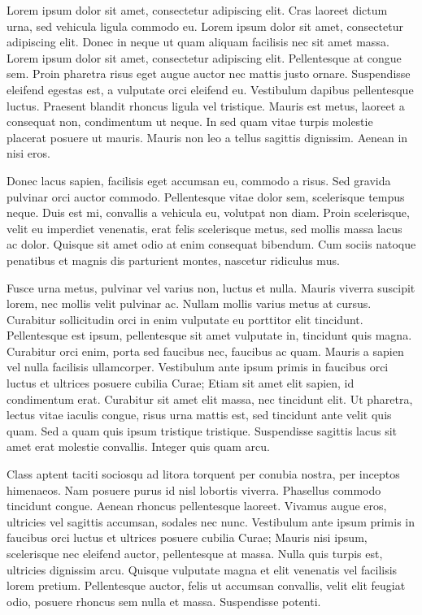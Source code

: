 \documentclass[12pt]{hw}
\begin{document}
Lorem ipsum dolor sit amet, consectetur adipiscing elit. Cras laoreet 
dictum urna, sed vehicula ligula commodo eu. Lorem ipsum dolor sit 
amet, consectetur adipiscing elit. Donec in neque ut quam aliquam 
facilisis nec sit amet massa. Lorem ipsum dolor sit amet, consectetur 
adipiscing elit. Pellentesque at congue sem. Proin pharetra risus 
eget augue auctor nec mattis justo ornare. Suspendisse eleifend 
egestas est, a vulputate orci eleifend eu. Vestibulum dapibus 
pellentesque luctus. Praesent blandit rhoncus ligula vel tristique. 
Mauris est metus, laoreet a consequat non, condimentum ut neque. In 
sed quam vitae turpis molestie placerat posuere ut mauris. Mauris non leo a
tellus sagittis dignissim. Aenean in nisi eros.

Donec lacus sapien, facilisis eget accumsan eu, commodo a risus. Sed
gravida pulvinar orci auctor commodo. Pellentesque vitae dolor sem,
scelerisque tempus neque. Duis est mi, convallis a vehicula eu, volutpat
non diam. Proin scelerisque, velit eu imperdiet venenatis, erat felis
scelerisque metus, sed mollis massa lacus ac dolor. Quisque sit amet odio
at enim consequat bibendum. Cum sociis natoque penatibus et magnis dis
parturient montes, nascetur ridiculus mus.

Fusce urna metus, pulvinar vel varius non, luctus et nulla. Mauris viverra
suscipit lorem, nec mollis velit pulvinar ac. Nullam mollis varius metus at
cursus. Curabitur sollicitudin orci in enim vulputate eu porttitor elit
tincidunt. Pellentesque est ipsum, pellentesque sit amet vulputate in,
tincidunt quis magna. Curabitur orci enim, porta sed faucibus nec, faucibus
ac quam. Mauris a sapien vel nulla facilisis ullamcorper. Vestibulum ante
ipsum primis in faucibus orci luctus et ultrices posuere cubilia Curae;
Etiam sit amet elit sapien, id condimentum erat. Curabitur sit amet elit
massa, nec tincidunt elit. Ut pharetra, lectus vitae iaculis congue, risus
urna mattis est, sed tincidunt ante velit quis quam. Sed a quam quis ipsum
tristique tristique. Suspendisse sagittis lacus sit amet erat molestie
convallis. Integer quis quam arcu.

Class aptent taciti sociosqu ad litora torquent per conubia nostra, per
inceptos himenaeos. Nam posuere purus id nisl lobortis viverra. Phasellus
commodo tincidunt congue. Aenean rhoncus pellentesque laoreet. Vivamus
augue eros, ultricies vel sagittis accumsan, sodales nec nunc. Vestibulum
ante ipsum primis in faucibus orci luctus et ultrices posuere cubilia
Curae; Mauris nisi ipsum, scelerisque nec eleifend auctor, pellentesque at
massa. Nulla quis turpis est, ultricies dignissim arcu. Quisque vulputate
magna et elit venenatis vel facilisis lorem pretium. Pellentesque auctor,
felis ut accumsan convallis, velit elit feugiat odio, posuere rhoncus sem
nulla et massa. Suspendisse potenti.
\end{document}
